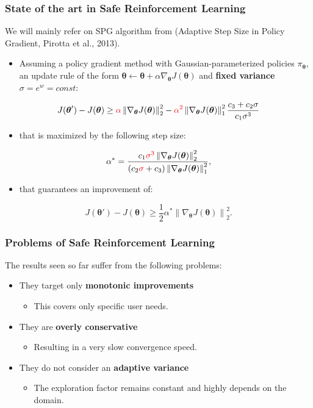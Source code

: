\documentclass{beamer}
\newcommand{\norm}[2][1]{\left\| #2 \right\|_{#1}}
\newcommand{\vtheta}{{\boldsymbol{\theta}}}
\newcommand*{\gradj}{\nabla_{\vtheta}J(\vtheta)}
\begin{document}
\begin{frame}
\frametitle{State of the art in Safe Reinforcement Learning}
We will mainly refer on SPG algorithm from (Adaptive Step Size in Policy Gradient, Pirotta et al., 2013).

\begin{itemize}
	\item Assuming a policy gradient method with Gaussian-parameterized policies $\pi_{\vtheta}$, an update rule of the form $\vtheta \gets \vtheta + \alpha\gradj$ and \textbf{fixed variance} $\sigma = e^w = const$:
\end{itemize}
\[
J(\vtheta') - J(\vtheta) \geq \textcolor{red}{\alpha} \norm[2]{\nabla_{\vtheta}J(\vtheta)}^2 - \textcolor{red}{\alpha^2} \norm[1]{\nabla_{\vtheta}J(\vtheta)}^2 \frac{c_3 + c_2 \sigma }{c_1 \sigma^3}
\]
\begin{itemize}
	\item that is maximized by the following step size: 
\end{itemize}
	\[
\alpha^* =  \frac{c_1 \textcolor{red}{\sigma^3} \norm[2]{\gradj}^2}{\left(c_2 \textcolor{red}{\sigma} + c_3 \right) \norm[1]{\gradj}^2},
\]
\begin{itemize}
\item that guarantees an improvement of:
\end{itemize}
\[
J(\vtheta') - J(\vtheta) \geq \frac{1}{2}\alpha^* \norm[2]{\gradj}^2.
\]



\end{frame}


\begin{frame}
\frametitle{Problems of Safe Reinforcement Learning}

The results seen so far suffer from the following problems:
\begin{itemize}

\item They target only \textbf{monotonic improvements}
\begin{itemize}
\item This covers only specific user needs.
\end{itemize}

\item They are \textbf{overly conservative}
\begin{itemize}
\item Resulting in a very slow convergence speed.
\end{itemize}

\item They do not consider an \textbf{adaptive variance}
\begin{itemize}
\item The exploration factor remains constant and highly depends on the domain.
\end{itemize}

\end{itemize}


\end{frame}
\end{document}
